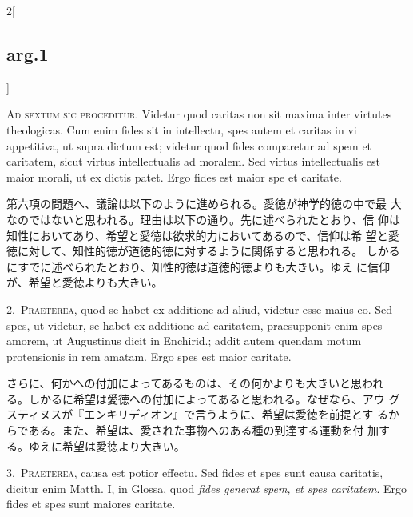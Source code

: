 \documentclass[paper=a4paper,fontsize=10pt,jafontsize=9pt,titlepage]{jlreq}
\begin{document}
\begin{paracol}{2}[\subsection{arg.1}]

{\scshape Ad sextum sic proceditur}. Videtur quod caritas non sit
maxima inter virtutes theologicas. Cum enim fides sit in intellectu,
spes autem et caritas in vi appetitiva, ut supra dictum est; videtur
quod fides comparetur ad spem et caritatem, sicut virtus
intellectualis ad moralem. Sed virtus intellectualis est maior morali,
ut ex dictis patet. Ergo fides est maior spe et caritate.

\switchcolumn

第六項の問題へ、議論は以下のように進められる。愛徳が神学的徳の中で最
 大なのではないと思われる。理由は以下の通り。先に述べられたとおり、信
 仰は知性においてあり、希望と愛徳は欲求的力においてあるので、信仰は希
 望と愛徳に対して、知性的徳が道徳的徳に対するように関係すると思われる。
 しかるにすでに述べられたとおり、知性的徳は道徳的徳よりも大きい。ゆえ
 に信仰が、希望と愛徳よりも大きい。


2.~{\scshape Praeterea}, quod se habet ex additione ad aliud, videtur
esse maius eo. Sed spes, ut videtur, se habet ex additione ad
caritatem, praesupponit enim spes amorem, ut Augustinus dicit in
Enchirid.; addit autem quendam motum protensionis in rem amatam. Ergo
spes est maior caritate.

\switchcolumn

さらに、何かへの付加によってあるものは、その何かよりも大きいと思われ
 る。しかるに希望は愛徳への付加によってあると思われる。なぜなら、アウ
 グスティヌスが『エンキリディオン』で言うように、希望は愛徳を前提とす
 るからである。また、希望は、愛された事物へのある種の到達する運動を付
 加する。ゆえに希望は愛徳より大きい。


3.~{\scshape Praeterea}, causa est potior effectu. Sed fides et spes
sunt causa caritatis, dicitur enim Matth. I, in Glossa, quod {\itshape
fides generat spem, et spes caritatem}. Ergo fides et spes sunt
maiores caritate.


\end{paracol}
\end{document}
